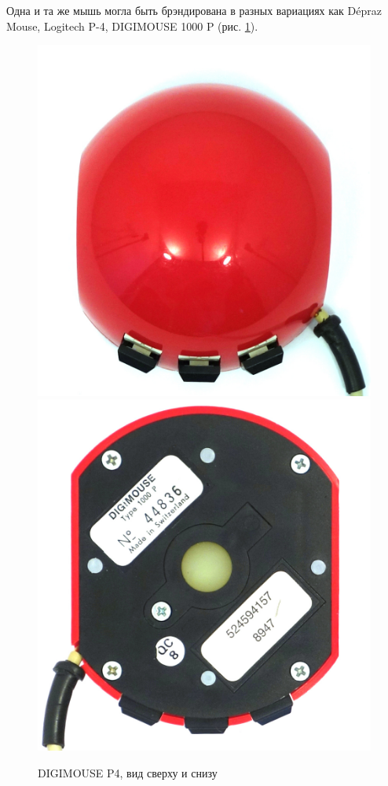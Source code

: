 \documentclass[11pt, a4paper]{article}
\begin{document}
Одна и та же мышь могла быть брэндирована в разных вариациях как Dépraz Mouse, Logitech P-4, DIGIMOUSE 1000 P (рис. \ref{fig:DIGIMOUSEP4TopAndBottom}).

\begin{figure}[h]
    \centering
    \includegraphics[scale=0.4]{1982_depraz_digimouse/top_60.jpg}
    \includegraphics[scale=0.37]{1982_depraz_digimouse/bottom_60.jpg}
    \caption{DIGIMOUSE P4, вид сверху и снизу}
    \label{fig:DIGIMOUSEP4TopAndBottom}
\end{figure}
\end{document}
